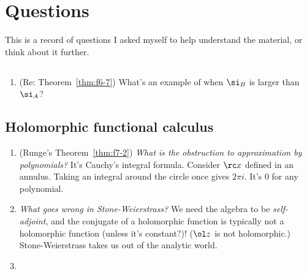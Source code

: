 \chapter{Questions}

This is a record of questions I asked myself to help understand the material, or think about it further.
\section{}
\section{}
\section{}
\section{}
\section{}
\section{}
\begin{enumerate}
\item
(Re: Theorem~\ref{thm:f6-7}) What's an example of when $\si_B$ is larger than $\si_A$?
\end{enumerate}
\section{Holomorphic functional calculus}
\begin{enumerate}
\item
(Runge's Theorem~\ref{thm:f7-2}) {\it What is the obstruction to approximation by polynomials?} It's Cauchy's integral formula. Consider $\rc x$ defined in an annulus. Taking an integral around the circle once gives $2\pi i$. It's 0 for any polynomial.
\item
{\it What goes wrong in Stone-Weierstrass?} We need the algebra to be {\it self-adjoint}, and the conjugate of a holomorphic function is typically not a holomorphic function (unless it's constant?)! ($\ol z$ is not holomorphic.) Stone-Weierstrass takes us out of the analytic world.
\item
\end{enumerate}

